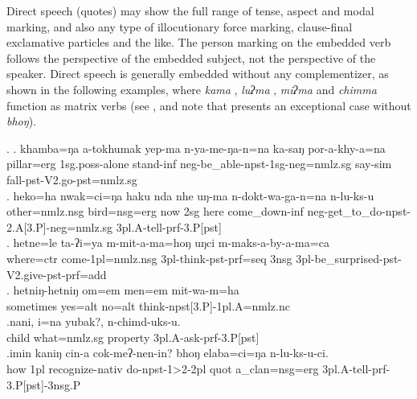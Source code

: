 Direct speech (quotes) may show the full range of tense, aspect and modal marking, and also any type of illocutionary force marking, clause-final exclamative particles and the like. The person marking on the embedded verb follows the perspective of the embedded subject, not the perspective of the speaker. Direct speech is generally embedded without any complementizer, as shown in the following examples, where \emph{kama} , \emph{luʔma} ,  \emph{miʔma}  and \emph{chimma}  function as matrix verbs (see \Next, and note that  \Next[e] presents an exceptional case without \emph{bhoŋ}).

\ex. \ag. khamba=ŋa a-tokhumak yep-ma n-ya-me-ŋa-n=na ka-saŋ por-a-khy-a=na\\
pillar{\sc =erg} {\sc 1sg.poss}-alone stand{\sc -inf} {\sc neg-}be\_able{\sc -npst-1sg-neg=nmlz.sg} say{\sc -sim} fall{\sc [3sg]-pst-V2.go-pst=nmlz.sg}\\
 
\bg. heko=ha nwak=ci=ŋa haku nda nhe uŋ-ma n-dokt-wa-ga-n=na n-lu-ks-u\\
	other{\sc =nmlz.nsg} bird{\sc =nsg=erg}	now {\sc 2sg} here come\_down{\sc -inf} {\sc neg-}get\_to\_do{\sc -npst-2.A[3.P]-neg=nmlz.sg} 	{\sc 3pl.A}-tell-{\sc prf-3.P[pst]}\\
	 
	\bg. hetne=le ta-ʔi=ya m-mit-a-ma=hoŋ uŋci m-maks-a-by-a-ma=ca\\
	where{\sc =ctr} come{\sc -1pl=nmlz.nsg} {\sc 3pl-}think{\sc -pst-prf=seq} {\sc 3nsg} {\sc 3pl}-be\_surprised-{\sc pst-V2.give-pst-prf=add}\\
	 
\bg. hetniŋ-hetniŋ om=em men=em mit-wa-m=ha\\
sometimes yes{\sc =alt} no{\sc =alt} think{\sc -npst[3.P]-1pl.A=nmlz.nc}\\
\bg.nani,  i=na           yubak?, n-chimd-uks-u.\\
child what{\sc =nmlz.sg} property {\sc 3pl.A-}ask{\sc -prf-3.P[pst]}\\
 
\bg.imin kaniŋ cin-a             cok-meʔ-nen-in?             bhoŋ elaba=ci=ŋa               n-lu-ks-u-ci.\\
how {\sc 1pl} recognize{\sc -nativ} do{\sc -npst-1>2-2pl} {\sc quot} a\_clan{\sc =nsg=erg} {\sc 3pl.A-}tell{\sc -prf-3.P[pst]-3nsg.P}\\
 


